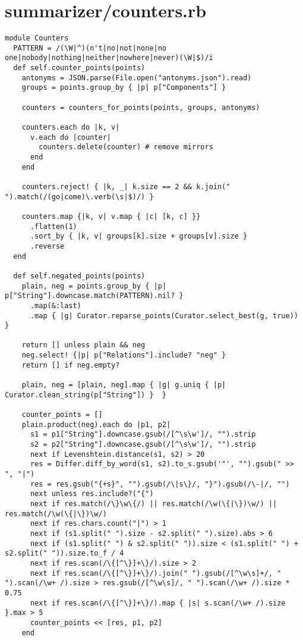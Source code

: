 \documentclass{article}
\begin{document}
\section*{summarizer/counters.rb}
\begin{verbatim}
module Counters
  PATTERN = /(\W|^)(n't|no|not|none|no one|nobody|nothing|neither|nowhere|never)(\W|$)/i
  def self.counter_points(points)
    antonyms = JSON.parse(File.open("antonyms.json").read)
    groups = points.group_by { |p| p["Components"] }

    counters = counters_for_points(points, groups, antonyms)

    counters.each do |k, v|
      v.each do |counter|
        counters.delete(counter) # remove mirrors
      end
    end

    counters.reject! { |k, _| k.size == 2 && k.join(" ").match(/(go|come)\.verb(\s|$)/) }

    counters.map {|k, v| v.map { |c| [k, c] }}
      .flatten(1)
      .sort_by { |k, v| groups[k].size + groups[v].size }
      .reverse
  end

  def self.negated_points(points)
    plain, neg = points.group_by { |p| p["String"].downcase.match(PATTERN).nil? }
      .map(&:last)
      .map { |g| Curator.reparse_points(Curator.select_best(g, true)) }

    return [] unless plain && neg
    neg.select! {|p| p["Relations"].include? "neg" }
    return [] if neg.empty?

    plain, neg = [plain, neg].map { |g| g.uniq { |p| Curator.clean_string(p["String"]) }  }

    counter_points = []
    plain.product(neg).each do |p1, p2|
      s1 = p1["String"].downcase.gsub(/[^\s\w']/, "").strip
      s2 = p2["String"].downcase.gsub(/[^\s\w']/, "").strip
      next if Levenshtein.distance(s1, s2) > 20
      res = Differ.diff_by_word(s1, s2).to_s.gsub('"', "").gsub(" >> ", "|")
      res = res.gsub("{+s}", "").gsub(/\|s\}/, "}").gsub(/\-|/, "")
      next unless res.include?("{")
      next if res.match(/\}\w\{/) || res.match(/\w(\{|\})\w/) || res.match(/\w(\{|\})\w/)
      next if res.chars.count("|") > 1
      next if (s1.split(" ").size - s2.split(" ").size).abs > 6
      next if (s1.split(" ") & s2.split(" ")).size < (s1.split(" ") + s2.split(" ")).size.to_f / 4
      next if res.scan(/\{[^\}]+\}/).size > 2
      next if res.scan(/\{[^\}]+\}/).join(" ").gsub(/[^\w\s]+/, " ").scan(/\w+ /).size > res.gsub(/[^\w\s]/, " ").scan(/\w+ /).size * 0.75
      next if res.scan(/\{[^\}]+\}/).map { |s| s.scan(/\w+ /).size }.max > 5
      counter_points << [res, p1, p2]
    end


\end{verbatim}
\end{document}
